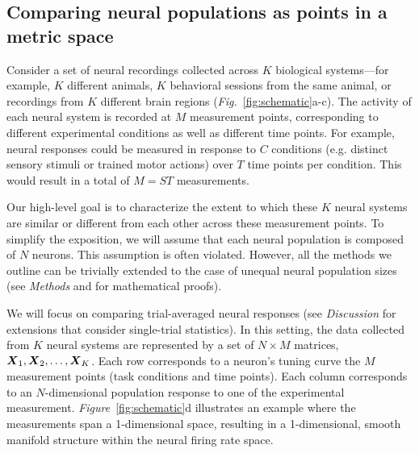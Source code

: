 
\subsection{Comparing neural populations as points in a metric space}


Consider a set of neural recordings collected across $K$ biological systems---for example, $K$ different animals, $K$ behavioral sessions from the same animal, or recordings from $K$ different brain regions (\textit{Fig.}~\ref{fig:schematic}a-c).
The activity of each neural system is recorded at $M$ measurement points, corresponding to different experimental conditions as well as different time points.
For example, neural responses could be measured in response to $C$ conditions (e.g. distinct sensory stimuli or trained motor actions) over $T$ time points per condition.
This would result in a total of $M = S T$ measurements.

Our high-level goal is to characterize the extent to which these $K$ neural systems are similar or different from each other across these measurement points.
To simplify the exposition, we will assume that each neural population is composed of $N$ neurons.
This assumption is often violated.
However, all the methods we outline can be trivially extended to the case of unequal neural population sizes (see \textit{Methods} and \cite{harvey2024duality} for mathematical proofs).


We will focus on comparing trial-averaged neural responses (see \textit{Discussion} for extensions that consider single-trial statistics).
In this setting, the data collected from $K$ neural systems are represented by a set of $N \times M$ matrices, $\boldsymbol{X}_1, \boldsymbol{X}_2, \dots, \boldsymbol{X}_K$.
Each row corresponds to a neuron's tuning curve the $M$ measurement points (task conditions and time points).
Each column corresponds to an $N$-dimensional population response to one of the experimental measurement.
\textit{Figure}~\ref{fig:schematic}d illustrates an example where the measurements span a 1-dimensional space, resulting in a 1-dimensional, smooth manifold structure within the neural firing rate space.


